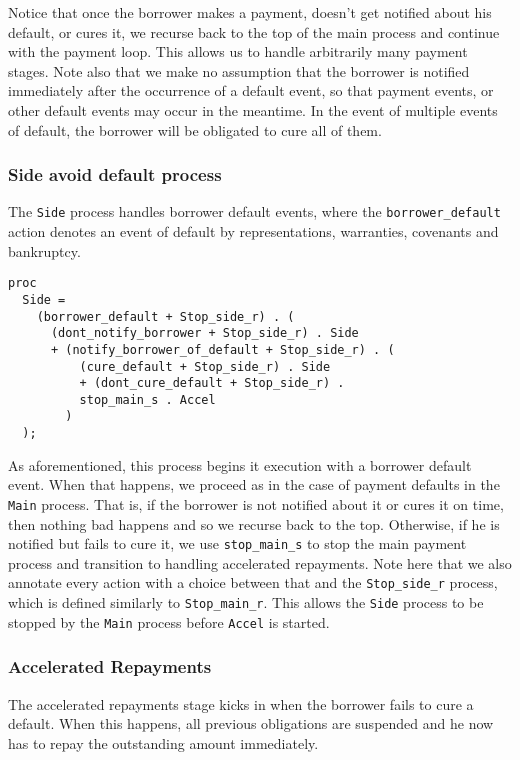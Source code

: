 \documentclass{article}
\begin{document}
Notice that once the borrower makes a payment, doesn't get notified about his
default, or cures it, we recurse back to the top of the main process and
continue with the payment loop.
This allows us to handle arbitrarily many payment stages.
Note also that we make no assumption that the borrower is notified immediately
after the occurrence of a default event, so that payment events, or other
default events may occur in the meantime.
In the event of multiple events of default, the borrower will be obligated to
cure all of them.

\subsubsection{Side avoid default process}
The \texttt{Side} process handles borrower default events, where the
\texttt{borrower\_default} action denotes an event of default by
representations, warranties, covenants and bankruptcy.

\begin{lstlisting}
proc
  Side =
    (borrower_default + Stop_side_r) . (
      (dont_notify_borrower + Stop_side_r) . Side
      + (notify_borrower_of_default + Stop_side_r) . (
          (cure_default + Stop_side_r) . Side
          + (dont_cure_default + Stop_side_r) .
          stop_main_s . Accel
        )
  );
\end{lstlisting}

As aforementioned, this process begins it execution with a borrower default
event.
When that happens, we proceed as in the case of payment defaults in the
\texttt{Main} process.
That is, if the borrower is not notified about it or cures it on time, then
nothing bad happens and so we recurse back to the top.
Otherwise, if he is notified but fails to cure it, we use
\texttt{stop\_main\_s} to stop the main payment process and transition to
handling accelerated repayments.
Note here that we also annotate every action with a choice between that and
the \texttt{Stop\_side\_r} process, which is defined similarly to
\texttt{Stop\_main\_r}.
This allows the \texttt{Side} process to be stopped by the \texttt{Main}
process before \texttt{Accel} is started.

\subsubsection{Accelerated Repayments}
The accelerated repayments stage kicks in when the borrower fails to cure
a default.
When this happens, all previous obligations are suspended and he now has to
repay the outstanding amount immediately.
\end{document}

